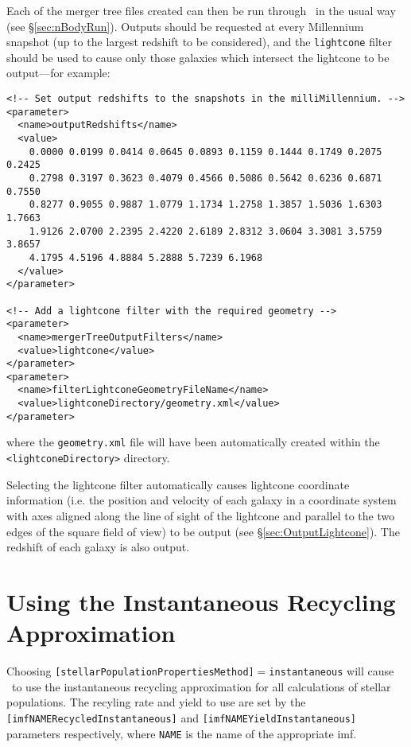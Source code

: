Each of the merger tree files created can then be run through \glc\ in the usual way (see \S\ref{sec:nBodyRun}).  Outputs should be requested at every Millennium snapshot (up to the largest redshift to be considered), and the {\tt lightcone} filter should be used to cause only those galaxies which intersect the lightcone to be output---for example:
\begin{verbatim}
<!-- Set output redshifts to the snapshots in the milliMillennium. -->                                                                                                
<parameter>
  <name>outputRedshifts</name>
  <value>
    0.0000 0.0199 0.0414 0.0645 0.0893 0.1159 0.1444 0.1749 0.2075 0.2425
    0.2798 0.3197 0.3623 0.4079 0.4566 0.5086 0.5642 0.6236 0.6871 0.7550
    0.8277 0.9055 0.9887 1.0779 1.1734 1.2758 1.3857 1.5036 1.6303 1.7663
    1.9126 2.0700 2.2395 2.4220 2.6189 2.8312 3.0604 3.3081 3.5759 3.8657
    4.1795 4.5196 4.8884 5.2888 5.7239 6.1968
  </value>
</parameter>

<!-- Add a lightcone filter with the required geometry -->                                                                    
<parameter>
  <name>mergerTreeOutputFilters</name>
  <value>lightcone</value>
</parameter>
<parameter>
  <name>filterLightconeGeometryFileName</name>
  <value>lightconeDirectory/geometry.xml</value>
</parameter>                                                                                                                                                          
\end{verbatim}
where the {\tt geometry.xml} file will have been automatically created within the {\tt \textless lightconeDirectory\textgreater} directory.

Selecting the lightcone filter automatically causes lightcone coordinate information (i.e. the position and velocity of each galaxy in a coordinate system with axes aligned along the line of sight of the lightcone and parallel to the two edges of the square field of view) to be output (see \S\ref{sec:OutputLightcone}). The redshift of each galaxy is also output.

\section{Using the Instantaneous Recycling Approximation}

Choosing {\tt [stellarPopulationPropertiesMethod]}$=${\tt instantaneous} will cause \glc\ to use the instantaneous recycling approximation for all calculations of stellar populations. The recyling rate and yield to use are set by the {\tt [imfNAMERecycledInstantaneous]} and {\tt [imfNAMEYieldInstantaneous]} parameters respectively, where {\tt NAME} is the name of the appropriate \gls{imf}.

